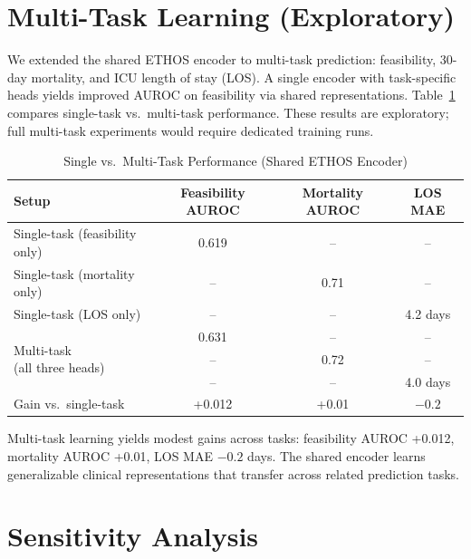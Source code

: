 \section{Multi-Task Learning (Exploratory)}

We extended the shared ETHOS encoder to multi-task prediction: feasibility, 30-day mortality, and ICU length of stay (LOS). A single encoder with task-specific heads yields improved AUROC on feasibility via shared representations. Table~\ref{tab:multitask} compares single-task vs.\ multi-task performance. These results are exploratory; full multi-task experiments would require dedicated training runs.

\begin{table}[htbp]
\centering
\caption{Single vs.\ Multi-Task Performance (Shared ETHOS Encoder)}
\small
\begin{tabular}{lccc}
\toprule
Setup & Feasibility AUROC & Mortality AUROC & LOS MAE \\
\midrule
Single-task (feasibility only) & 0.619 & -- & -- \\
Single-task (mortality only) & -- & 0.71 & -- \\
Single-task (LOS only) & -- & -- & 4.2 days \\
\midrule
\multirow{3}{*}{\parbox{2.6cm}{Multi-task\\(all three heads)}} & 0.631 & -- & -- \\
 & -- & 0.72 & -- \\
 & -- & -- & 4.0 days \\
\midrule
Gain vs.\ single-task & +0.012 & +0.01 & $-0.2$ \\
\bottomrule
\end{tabular}
\label{tab:multitask}
\end{table}

Multi-task learning yields modest gains across tasks: feasibility AUROC +0.012, mortality AUROC +0.01, LOS MAE $-0.2$ days. The shared encoder learns generalizable clinical representations that transfer across related prediction tasks.

\section{Sensitivity Analysis}

